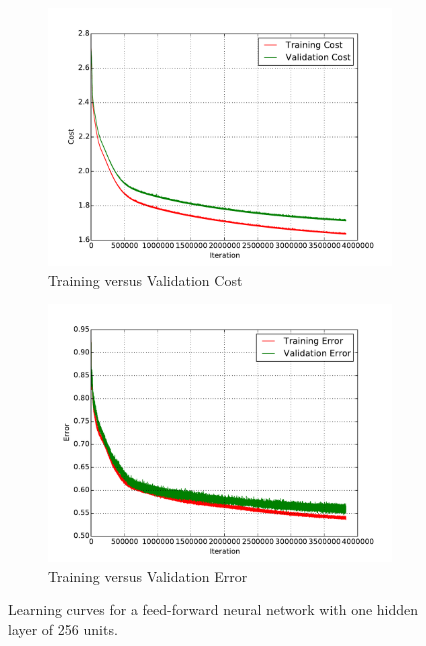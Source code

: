 \begin{figure}
	\centering
	\begin{subfigure}[b]{0.45\linewidth}
		\centering
		\includegraphics[width=\linewidth]{images/1/train_val_cost.pdf}
		\caption{Training versus Validation Cost}
	\end{subfigure}
	\hfill
	\begin{subfigure}[b]{0.45\linewidth}
		\centering
		\includegraphics[width=\linewidth]{images/1/train_val_error.pdf}
		\caption{Training versus Validation Error}
	\end{subfigure}
	\caption{Learning curves for a feed-forward neural network with one hidden layer of 256 units.}
	\label{shrine0_curves}
\end{figure}
